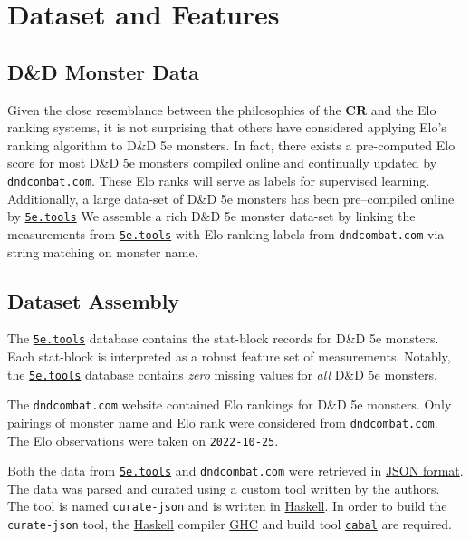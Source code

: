 \documentclass{article}
\newcommand{\Qty}[1]{\oldstylenums{#1}}
\newcommand{\CR}{\ensuremath{\mathbf{CR}}\xspace}
\newcommand{\DnD}{D\&D 5e\xspace}
\newcommand{\FiveETools}{\href{https://5etools-mirror-1.github.io/}{\texttt{5e.tools}}\xspace}
\newcommand{\DnDCombat}{\texttt{dndcombat.com}\xspace}
\begin{document}
\section{Dataset and Features}

\hypertarget{the-dd-monster-data}{%
	\subsection{D\&D Monster Data}\label{the-dd-monster-data}}

Given the close resemblance between the philosophies of the \CR and the Elo ranking systems, it is not surprising that others have considered applying Elo's ranking algorithm to \DnD monsters.
In fact, there exists a pre-computed Elo score for most \DnD monsters compiled online and continually updated by \DnDCombat \cite{DnDCombat}.
These Elo ranks will serve as labels for supervised learning.
Additionally, a large data-set of \DnD monsters has been pre--compiled online by \FiveETools \cite{Mirror5eTools}
We assemble a rich \DnD monster data-set by linking the measurements from \FiveETools with Elo-ranking labels from \DnDCombat via string matching on monster name.


\hypertarget{datset-assembly}{%
\subsection{Dataset Assembly}\label{datset-assembly}}

The \FiveETools database contains the stat-block records for \Qty{2,333} \DnD monsters.
Each stat-block is interpreted as a robust feature set of \Qty{71} measurements.
Notably, the \FiveETools database contains \emph{zero} missing values for \emph{all} \Qty{2,333} \DnD monsters.

The \DnDCombat website contained Elo rankings for \Qty{2,936} \DnD monsters.
Only pairings of monster name and Elo rank were considered from \DnDCombat.
The Elo observations were taken on \texttt{2022-10-25}.


Both the data from \FiveETools and \DnDCombat were retrieved in \href{https://en.wikipedia.org/wiki/JSON}{JSON format}.
The data was parsed and curated using a custom tool written by the authors.
The tool is named \texttt{curate-json} and is written in \href{https://www.haskell.org/}{Haskell}.
In order to build the \texttt{curate-json} tool, the \href{https://www.haskell.org/}{Haskell} compiler \href{https://www.haskell.org/ghc/download.html}{GHC} and build tool \href{https://www.haskell.org/cabal/download.html}{\texttt{cabal}}
are required. 
\end{document}
